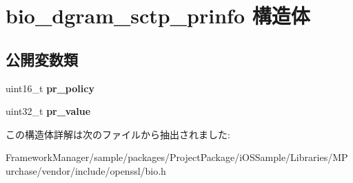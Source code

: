 \hypertarget{structbio__dgram__sctp__prinfo}{}\section{bio\+\_\+dgram\+\_\+sctp\+\_\+prinfo 構造体}
\label{structbio__dgram__sctp__prinfo}
\subsection*{公開変数類}
\begin{DoxyCompactItemize}
\item 
\hypertarget{structbio__dgram__sctp__prinfo_a758b4f0c23b00677d3e0f8b08b5166a8}{}uint16\+\_\+t {\bfseries pr\+\_\+policy}\label{structbio__dgram__sctp__prinfo_a758b4f0c23b00677d3e0f8b08b5166a8}

\item 
\hypertarget{structbio__dgram__sctp__prinfo_aaef676fc35f418527ebfde25c1fc047e}{}uint32\+\_\+t {\bfseries pr\+\_\+value}\label{structbio__dgram__sctp__prinfo_aaef676fc35f418527ebfde25c1fc047e}

\end{DoxyCompactItemize}


この構造体詳解は次のファイルから抽出されました\+:\begin{DoxyCompactItemize}
\item 
Framework\+Manager/sample/packages/\+Project\+Package/i\+O\+S\+Sample/\+Libraries/\+M\+Purchase/vendor/include/openssl/bio.\+h\end{DoxyCompactItemize}
